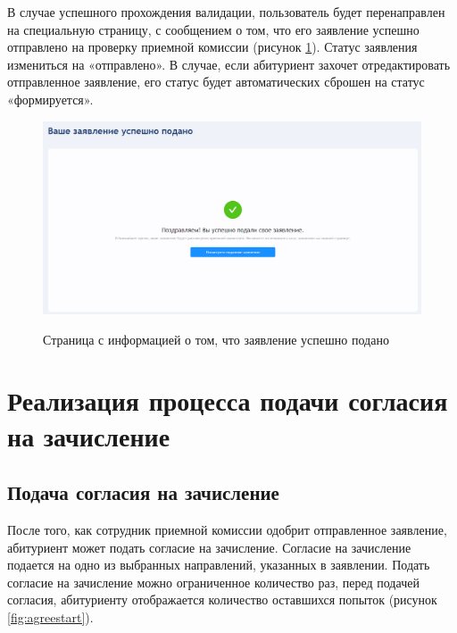 В случае успешного прохождения валидации, пользователь будет перенаправлен на специальную страницу, с сообщением о том, что его заявление успешно отправлено на проверку приемной комиссии (рисунок \ref{fig:statementsuccsess}). Статус заявления измениться на «отправлено».  В случае, если абитуриент захочет отредактировать отправленное заявление, его статус будет автоматических сброшен на статус «формируется».

\begin{figure}[H]
\begin{center}
\includegraphics[width=0.9\hsize]{fig/statement-succsess.png}\\[2mm]
\caption{Страница с информацией о том, что заявление успешно подано}\label{fig:statementsuccsess}
\end{center}
\end{figure}

\section{Реализация процесса подачи согласия на зачисление}

\subsection{Подача согласия на зачисление}

После того, как сотрудник приемной комиссии одобрит отправленное заявление, абитуриент может подать согласие на зачисление. Согласие на зачисление подается на одно из выбранных направлений, указанных в заявлении. Подать согласие на зачисление можно ограниченное количество раз, перед подачей согласия, абитуриенту отображается количество оставшихся попыток (рисунок \ref{fig:agreestart}).

